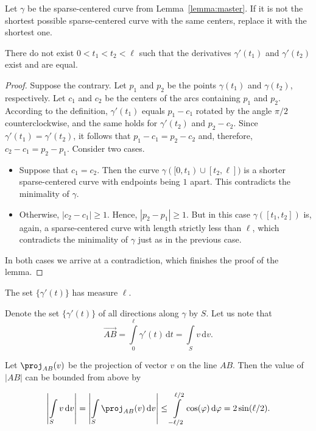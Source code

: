 Let $\gamma$ be the sparse-centered curve from Lemma~\ref{lemma:master}. If it is not the shortest possible sparse-centered curve with the same centers, replace it with the shortest one.

\begin{observation}
There do not exist $0 < t_1 < t_2 < \ell$ such that the derivatives $\gamma'(t_1)$ and $\gamma'(t_2)$ exist and are equal.
\end{observation}

\begin{proof}
Suppose the contrary. Let $p_1$ and $p_2$ be the points $\gamma(t_1)$ and $\gamma(t_2)$, respectively. Let $c_1$ and $c_2$ be the centers of the arcs containing $p_1$ and $p_2$. According to the definition, $\gamma'(t_1)$ equals $p_1 - c_1$ rotated by the angle $\pi/2$ counterclockwise, and the same holds for $\gamma'(t_2)$ and $p_2 - c_2$. Since $\gamma'(t_1) = \gamma'(t_2)$, it follows that $p_1 - c_1 = p_2 - c_2$ and, therefore, $c_2 - c_1 = p_2 - p_1$. Consider two cases.

\begin{itemize}
    \item Suppose that $c_1 = c_2$. Then the curve $\gamma([0, t_1)\cup[t_2, \ell])$ is a shorter sparse-centered curve with endpoints being $1$ apart. This contradicts the minimality of $\gamma$.
    
    \item Otherwise, $|c_2 - c_1| \geq 1$. Hence, $|p_2 - p_1|\geq 1$. But in this case $\gamma([t_1, t_2])$ is, again, a sparse-centered curve with length strictly less than $\ell$, which contradicts the minimality of $\gamma$ just as in the previous case.
\end{itemize}

In both cases we arrive at a contradiction, which finishes the proof of the lemma.
\end{proof}

\begin{corollary}
The set $\{\gamma'(t)\}$ has measure $\ell$.
\end{corollary}

Denote the set $\{\gamma'(t)\}$ of all directions along $\gamma$ by $S$. Let us note that $$\overrightarrow{AB} = \int\limits_0^{\ell}\gamma'(t)\,\mathrm{d}t = \int\limits_Sv\,\mathrm{d}v.$$

Let $\proj_{AB}(v)$ be the projection of vector $v$ on the line $AB$. Then the value of $|AB|$ can be bounded from above by

$$\left|\int\limits_Sv\,\mathrm{d}v\right| = \left|\int\limits_S\proj_{AB}(v)\,\mathrm{d}v\right| \leq \int\limits_{-\ell/2}^{\ell/2}\cos(\varphi)\,\mathrm{d}\varphi = 2\sin(\ell/2).$$

